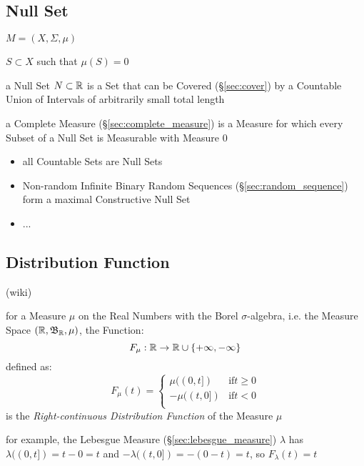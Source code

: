 \subsection{Null Set}\label{sec:null_set}

$M = (X, \Sigma, \mu)$

$S \subset X$ such that $\mu(S) = 0$

a Null Set $N \subset \mathbb{R}$ is a Set that can be Covered (\S\ref{sec:cover})
by a Countable Union of Intervals of arbitrarily small total length

a Complete Measure (\S\ref{sec:complete_measure}) is a Measure for which every
Subset of a Null Set is Measurable with Measure $0$

\begin{itemize}
  \item all Countable Sets are Null Sets
  \item Non-random Infinite Binary Random Sequences
    (\S\ref{sec:random_sequence}) form a maximal Constructive Null Set
  \item ...
\end{itemize}



\subsection{Distribution Function}\label{sec:distribution_function}

(wiki)

for a Measure $\mu$ on the Real Numbers with the Borel $\sigma$-algebra, i.e.
the Measure Space $(\mathbb{R}, \mathfrak{B}_{\mathbb{R}}, \mu)$, the Function:
\[
  F_\mu : \mathbb{R} \rightarrow \mathbb{R} \cup \{+\infty, -\infty\}
\]
defined as:
\[
  F_\mu(t) = \begin{cases}
     \mu((0,t]) & \text{if} t \geq 0 \\
    -\mu((t,0]) & \text{if} t < 0 \\
  \end{cases}
\]
is the \emph{Right-continuous Distribution Function} of the Measure $\mu$

for example, the Lebesgue Measure (\S\ref{sec:lebesgue_measure}) $\lambda$ has
$\lambda((0,t]) = t - 0 = t$ and $-\lambda((t,0]) = -(0 - t) = t$, so
$F_\lambda(t) = t$

